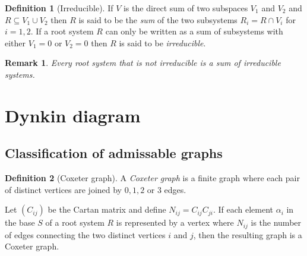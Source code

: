 \documentclass[twoside,utf8]{article}
\theoremstyle{plain}
\newtheorem*{remark}{Remark}
\theoremstyle{definition}
\newtheorem{definition}{Definition}
\theoremstyle{remark}
\begin{document}
\begin{definition}[Irreducible]
If $V$ is the direct sum of two subspaces $V_1$ and $V_2$ and $R\subseteq V_1 \cup V_2$ then $R$ is said to be the \textit{sum} of the two subsystems $R_i = R\cap V_i$ for $i=1,2$. If a root system $R$ can only be written as a sum of subsystems with either $V_1=0$ or $V_2=0$ then $R$ is said to be \textit{irreducible}.
\end{definition}


\begin{remark}
Every root system that is not irreducible is a sum of irreducible systems.
\end{remark}


\section{ Dynkin diagram }

\subsection{Classification of admissable graphs}

\begin{definition}[Coxeter graph]
A \textit{Coxeter graph} is a finite graph where each pair of distinct vertices are joined by $0,1,2$ or $3$ edges. 
\end{definition}

\noindent
Let $(C_{ij})$ be the Cartan matrix and define $N_{ij}=C_{ij}C_{ji}$. If each element $\alpha_i$ in the base $S$ of a root system $R$ is represented by a vertex where $N_{ij}$ is the number of edges connecting the two distinct vertices $i$ and $j$, then the resulting graph is a Coxeter graph.
\end{document}
